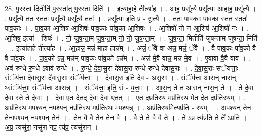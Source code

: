 \documentclass[17pt]{extarticle}
\begin{document}
28. पु॒रस्ता॒ दितीति॑ पु॒रस्ता᳚त् पु॒रस्ता॒ दिति॑ । . इत्या॑हा॒हे तीत्या॑ह । . आ॒ह॒ प्रसू᳚त्यै॒ प्रसू᳚त्या आहाह॒ प्रसू᳚त्यै । . प्रसू᳚त्यै॒ तत॒ स्ततः॒ प्रसू᳚त्यै॒ प्रसू᳚त्यै॒ ततः॑ । . प्रसू᳚त्या॒ इति॒ प्र - सू॒त्यै॒ । . ततः॑ पाव॒काः पा॑व॒का स्तत॒ स्ततः॑ पाव॒काः । . पा॒व॒का आ॒शिष॑ आ॒शिषः॑ पाव॒काः पा॑व॒का आ॒शिषः॑ । . आ॒शिषो॑ नो न आ॒शिष॑ आ॒शिषो॑ नः । . आ॒शिष॒ इत्या᳚ - शिषः॑ । . नो॒ जु॒ष॒न्ता॒म् जु॒ष॒न्ता॒म् नो॒ नो॒ जु॒ष॒न्ता॒म् । . जु॒ष॒न्ता॒ मितीति॑ जुषन्ताम् जुषन्ता॒ मिति॑ । . इत्या॑हा॒हे तीत्या॑ह । . आ॒हान्न॒ मन्न॑ माहा॒ हान्न᳚म् । . अन्नं॒ ॅवै वा अन्न॒ मन्नं॒ ॅवै । . वै पा॑व॒कः पा॑व॒को वै वै पा॑व॒कः । . पा॒व॒को ऽन्न॒ मन्न॑म् पाव॒कः पा॑व॒को ऽन्न᳚म् । . अन्न॑ मे॒वै वान्न॒ मन्न॑ मे॒व । . ए॒वावा वै॒वै वाव॑ । . अव॑ रुन्धे रु॒न्धे ऽवाव॑ रुन्धे । . रु॒न्धे॒ दे॒वा॒सु॒रा दे॑वासु॒रा रु॑न्धे रुन्धे देवासु॒राः । . दे॒वा॒सु॒राः संॅय॑त्ताः॒ संॅय॑त्ता देवासु॒रा दे॑वासु॒राः संॅय॑त्ताः । . दे॒वा॒सु॒रा इति॑ देव - अ॒सु॒राः । . संॅय॑त्ता आसन् नास॒न् थ्संॅय॑त्ताः॒ संॅय॑त्ता आसन्न् । . संॅय॑त्ता॒ इति॒ सं - य॒त्ताः॒ । . आ॒स॒न् ते त आ॑सन् नास॒न् ते । . ते दे॒वा दे॒वा स्ते ते दे॒वाः । . दे॒वा ए॒त दे॒तद् दे॒वा दे॒वा ए॒तत् । . ए॒त दप्र॑तिरथ॒ मप्र॑तिरथ मे॒त दे॒त दप्र॑तिरथम् । . अप्र॑तिरथ मपश्यन् नपश्य॒न् नप्र॑तिरथ॒ मप्र॑तिरथ मपश्यन्न् । . अप्र॑तिरथ॒मित्यप्र॑ति - र॒थ॒म् । . अ॒प॒श्य॒न् तेन॒ तेना॑पश्यन् नपश्य॒न् तेन॑ । . तेन॒ वै वै तेन॒ तेन॒ वै । . वै ते ते वै वै ते । . ते᳚ ऽप्र॒ त्य॑प्र॒ति ते ते᳚ ऽप्र॒ति । . अ॒प्र॒ त्यसु॑रा॒ नसु॑रा नप्र॒ त्य॑प्र॒ त्यसु॑रान् । \newline
\end{document}
